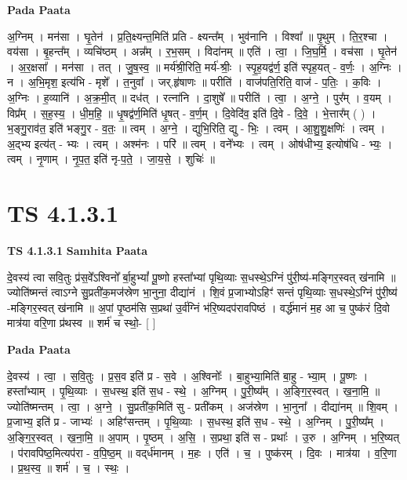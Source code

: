 \documentclass[17pt]{extarticle}
\begin{document}
\textbf{Pada Paata} \newline

अ॒ग्निम् । मन॑सा । घृ॒तेन॑ । प्र॒ति॒क्ष्यन्त॒मिति॑ प्रति - क्ष्यन्त᳚म् । भुव॑नानि । विश्वा᳚ ॥ पृ॒थुम् । ति॒र॒श्चा । वय॑सा । बृ॒हन्त᳚म् । व्यचि॑ष्ठम् । अन्न᳚म् । र॒भ॒सम् । विदा॑नम् ॥ एति॑ । त्वा॒ । जि॒घ॒र्मि॒ । वच॑सा । घृ॒तेन॑ । अ॒र॒क्षसा᳚ । मन॑सा । तत् । जु॒ष॒स्व॒ ॥ मर्य॑श्री॒रिति॒ मर्य॑-श्रीः॒ । स्पृ॒ह॒यद्व॑र्ण॒ इति॑ स्पृह॒यत् - व॒र्णः॒ । अ॒ग्निः । न । अ॒भि॒मृश॒ इत्य॑भि - मृशे᳚ । त॒नुवा᳚ । जर्.हृ॑षाणः ॥ परीति॑ । वाज॑पति॒रिति॒ वाज॑ - प॒तिः॒ । क॒विः । अ॒ग्निः । ह॒व्यानि॑ । अ॒क्र॒मी॒त् ॥ दध॑त् । रत्ना॑नि । दा॒शुषे᳚ ॥ परीति॑ । त्वा॒ । अ॒ग्ने॒ । पुर᳚म् । व॒यम् । विप्र᳚म् । स॒ह॒स्य॒ । धी॒म॒हि॒ ॥ धृ॒षद्व॑र्ण॒मिति॑ धृ॒षत् - व॒र्ण॒म् । दि॒वेदि॑व॒ इति॑ दि॒वे - दि॒वे॒ । भे॒त्तार᳚म् ( ) । भ॒ङ्गु॒राव॑त॒ इति॑ भङ्गु॒र - व॒तः॒ ॥ त्वम् । अ॒ग्ने॒ । द्युभि॒रिति॒ द्यु - भिः॒ । त्वम् । आ॒शु॒शु॒क्षणिः॑ । त्वम् । अ॒द्भ्य इत्य॑त् - भ्यः । त्वम् । अश्म॑नः । परि॑ ॥ त्वम् । वने᳚भ्यः । त्वम् । ओष॑धीभ्य॒ इत्योष॑धि - भ्यः॒ । त्वम् । नृ॒णाम् । नृ॒प॒त॒ इति॑ नृ-प॒ते॒ । जा॒य॒से॒ । शुचिः॑ ॥  \newline




\section*{ TS 4.1.3.1 }

\textbf{TS 4.1.3.1 } \newline
\textbf{Samhita Paata} \newline

दे॒वस्य॑ त्वा सवि॒तुः प्र॑स॒वे᳚ऽश्विनो᳚ र्बा॒हुभ्यां᳚ पू॒ष्णो हस्ता᳚भ्यां पृथि॒व्याः स॒धस्थे॒ऽग्निं पु॑री॒ष्य॑-मङ्गिर॒स्वत् ख॑नामि ॥ ज्योति॑ष्मन्तं त्वाऽग्ने सु॒प्रती॑क॒मज॑स्रेण भा॒नुना॒ दीद्या॑नं । शि॒वं प्र॒जाभ्योऽहिꣳ॑ सन्तं पृथि॒व्याः स॒धस्थे॒ऽग्निं पु॑री॒ष्य॑ -मङ्गिर॒स्वत् ख॑नामि ॥ अ॒पां पृ॒ष्ठम॑सि स॒प्रथा॑ उ॒र्व॑ग्निं भ॑रि॒ष्यदप॑रावपिष्ठं । वर्द्ध॑मानं म॒ह आ च॒ पुष्क॑रं दि॒वो मात्र॑या वरि॒णा प्र॑थस्व ॥ शर्म॑ च स्थो॒- [  ] \newline

\textbf{Pada Paata} \newline

दे॒वस्य॑ । त्वा॒ । स॒वि॒तुः । प्र॒स॒व इति॑ प्र - स॒वे । अ॒श्विनोः᳚ । बा॒हुभ्या॒मिति॑ बा॒हु - भ्या॒म् । पू॒ष्णः । हस्ता᳚भ्याम् । पृ॒थि॒व्याः । स॒धस्थ॒ इति॑ स॒ध - स्थे॒ । अ॒ग्निम् । पु॒री॒ष्य᳚म् । अ॒ङ्गि॒र॒स्वत् । ख॒ना॒मि॒ ॥ ज्योति॑ष्मन्तम् । त्वा॒ । अ॒ग्ने॒ । सु॒प्रती॑क॒मिति॑ सु - प्रती॑कम् । अज॑स्रेण । भा॒नुना᳚ । दीद्या॑नम् ॥ शि॒वम् । प्र॒जाभ्य॒ इति॑ प्र - जाभ्यः॑ । अहिꣳ॑सन्तम् । पृ॒थि॒व्याः । स॒धस्थ॒ इति॑ स॒ध - स्थे॒ । अ॒ग्निम् । पु॒री॒ष्य᳚म् । अ॒ङ्गि॒र॒स्वत् । ख॒ना॒मि॒ ॥ अ॒पाम् । पृ॒ष्ठम् । अ॒सि॒ । स॒प्रथा॒ इति॑ स - प्रथाः᳚ । उ॒रु । अ॒ग्निम् । भ॒रि॒ष्यत् । प॑रावपिष्ठ॒मित्यप॑रा - व॒पि॒ष्ठ॒म् ॥ वद्‌र्ध॑मानम् । म॒हः । एति॑ । च॒ । पुष्क॑रम् । दि॒वः । मात्र॑या । व॒रि॒णा । प्र॒थ॒स्व॒ ॥ शर्म॑ । च॒ । स्थः॒ ।  \newline
\end{document}
